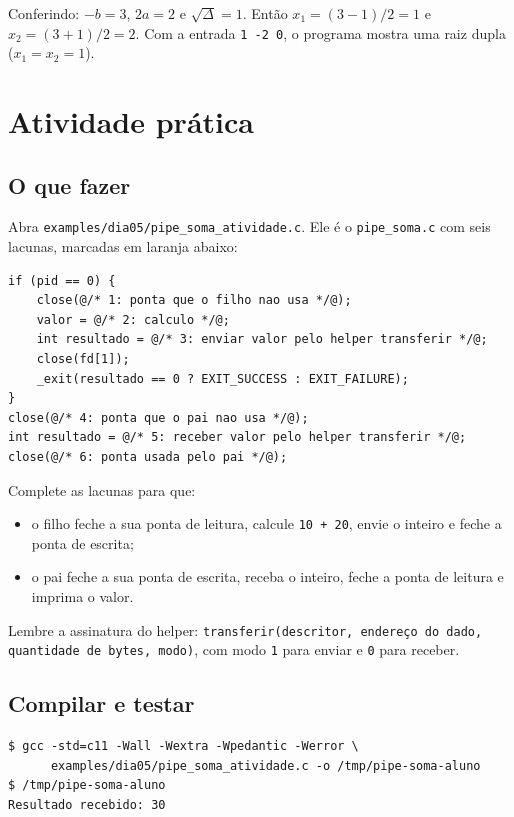 \documentclass[11pt,a4paper]{article}
\newcommand{\cmd}[1]{\texttt{#1}}
\begin{document}
Conferindo: $-b = 3$, $2a = 2$ e $\sqrt{\Delta} = 1$. Então $x_1 = (3 - 1)/2 = 1$ e $x_2 = (3 + 1)/2 = 2$. Com a entrada \cmd{1 -2 0}, o programa mostra uma raiz dupla ($x_1 = x_2 = 1$).

\section{Atividade prática}

\subsection{O que fazer}

Abra \cmd{examples/dia05/pipe\_soma\_atividade.c}. Ele é o \cmd{pipe\_soma.c} com seis lacunas, marcadas em laranja abaixo:

\begin{lstlisting}[style=codigo]
if (pid == 0) {
    close(@/* 1: ponta que o filho nao usa */@);
    valor = @/* 2: calculo */@;
    int resultado = @/* 3: enviar valor pelo helper transferir */@;
    close(fd[1]);
    _exit(resultado == 0 ? EXIT_SUCCESS : EXIT_FAILURE);
}
close(@/* 4: ponta que o pai nao usa */@);
int resultado = @/* 5: receber valor pelo helper transferir */@;
close(@/* 6: ponta usada pelo pai */@);
\end{lstlisting}

Complete as lacunas para que:

\begin{itemize}
    \item o filho feche a sua ponta de leitura, calcule \cmd{10 + 20}, envie o inteiro e feche a ponta de escrita;
    \item o pai feche a sua ponta de escrita, receba o inteiro, feche a ponta de leitura e imprima o valor.
\end{itemize}

Lembre a assinatura do helper: \cmd{transferir(descritor, endereço do dado, quantidade de bytes, modo)}, com modo \cmd{1} para enviar e \cmd{0} para receber.

\subsection{Compilar e testar}

\begin{lstlisting}[style=terminal]
$ gcc -std=c11 -Wall -Wextra -Wpedantic -Werror \
      examples/dia05/pipe_soma_atividade.c -o /tmp/pipe-soma-aluno
$ /tmp/pipe-soma-aluno
Resultado recebido: 30
\end{lstlisting}
\end{document}
